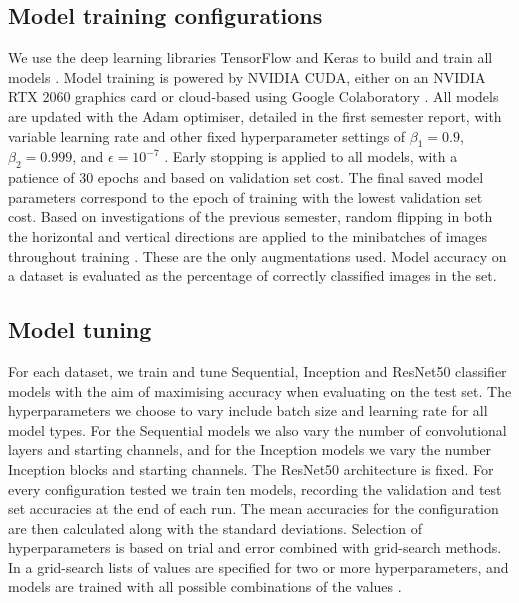 \documentclass[12pt]{article}
\begin{document}
\subsection{Model training configurations}
We use the deep learning libraries TensorFlow and Keras to build and train all models \cite{Abadi16, Gulli17}. Model training is powered by NVIDIA CUDA, either on an NVIDIA RTX 2060 graphics card or cloud-based using Google Colaboratory \cite{Cook12, Bisong19}. All models are updated with the Adam optimiser, detailed in the first semester report, with variable learning rate and other fixed hyperparameter settings of $\beta_1=0.9$, $\beta_2=0.999$, and $\epsilon=10^{-7}$ \cite{Heaton20, Kingma14}. Early stopping is applied to all models, with a patience of 30 epochs and based on validation set cost. The final saved model parameters correspond to the epoch of training with the lowest validation set cost. Based on investigations of the previous semester, random flipping in both the horizontal and vertical directions are applied to the minibatches of images throughout training \cite{Heaton20}. These are the only augmentations used. Model accuracy on a dataset is evaluated as the percentage of correctly classified images in the set. 

\subsection{Model tuning}
For each dataset, we train and tune Sequential, Inception and ResNet50 classifier models with the aim of maximising accuracy when evaluating on the test set. The hyperparameters we choose to vary include batch size and learning rate for all model types. For the Sequential models we also vary the number of convolutional layers and starting channels, and for the Inception models we vary the number Inception blocks and starting channels. The ResNet50 architecture is fixed. For every configuration tested we train ten models, recording the validation and test set accuracies at the end of each run. The mean accuracies for the configuration are then calculated along with the standard deviations. Selection of hyperparameters is based on trial and error combined with grid-search methods. In a grid-search lists of values are specified for two or more hyperparameters, and models are trained with all possible combinations of the values \cite{Goodfellow16}.

\end{document}
